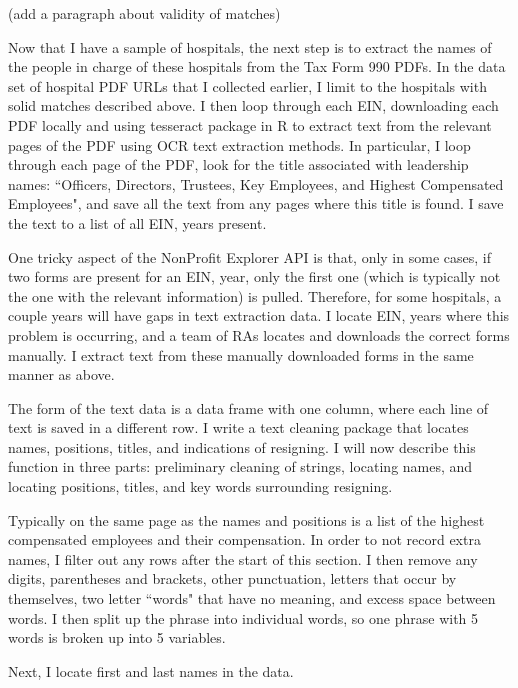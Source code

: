 \documentclass[12pt]{article}
\begin{document}
    (add a paragraph about validity of matches)

    Now that I have a sample of hospitals, the next step is to extract the names of the people in charge of these hospitals from the Tax Form 990 PDFs. In the data set of hospital PDF URLs that I collected earlier, I limit to the hospitals with solid matches described above. I then loop through each EIN, downloading each PDF locally and using tesseract package in R to extract text from the relevant pages of the PDF using OCR text extraction methods. In particular, I loop through each page of the PDF, look for the title associated with leadership names: ``Officers, Directors, Trustees, Key Employees, and Highest Compensated Employees", and save all the text from any pages where this title is found. I save the text to a list of all EIN, years present. 

    One tricky aspect of the NonProfit Explorer API is that, only in some cases, if two forms are present for an EIN, year, only the first one (which is typically not the one with the relevant information) is pulled. Therefore, for some hospitals, a couple years will have gaps in text extraction data. I locate EIN, years where this problem is occurring, and a team of RAs locates and downloads the correct forms manually. I extract text from these manually downloaded forms in the same manner as above. 

    The form of the text data is a data frame with one column, where each line of text is saved in a different row. I write a text cleaning package that locates names, positions, titles, and indications of resigning. I will now describe this function in three parts: preliminary cleaning of strings, locating names, and locating positions, titles, and key words surrounding resigning. 

    Typically on the same page as the names and positions is a list of the highest compensated employees and their compensation. In order to not record extra names, I filter out any rows after the start of this section. I then remove any digits, parentheses and brackets, other punctuation, letters that occur by themselves, two letter ``words" that have no meaning, and excess space between words. I then split up the phrase into individual words, so one phrase with 5 words is broken up into 5 variables. 

    Next, I locate first and last names in the data. 


    

    

    

    

    

    

	
	
	
\end{document}
